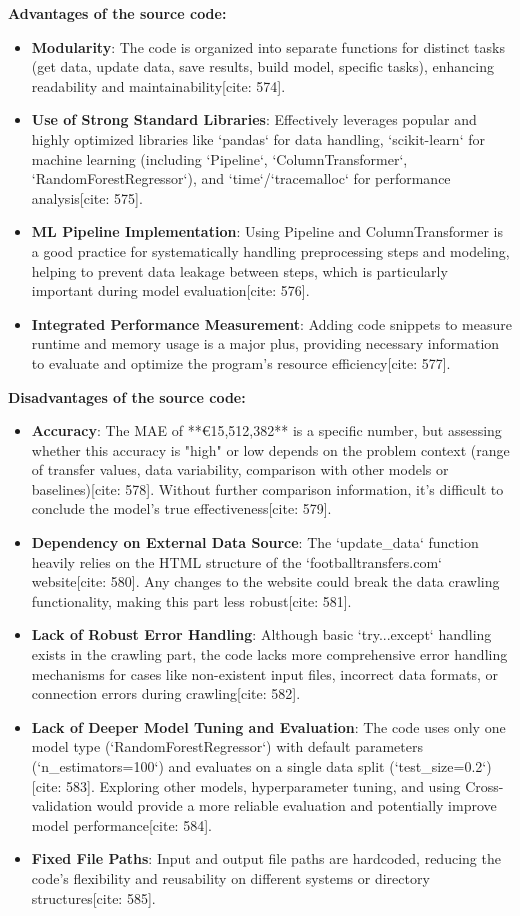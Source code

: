 \documentclass[12pt]{report}
\begin{document}
{{{\textbf{Advantages of the source code:}
\begin{itemize}
    \item \textbf{Modularity}: The code is organized into separate functions for distinct tasks (get data, update data, save results, build model, specific tasks), enhancing readability and maintainability[cite: 574].
    \item \textbf{Use of Strong Standard Libraries}: Effectively leverages popular and highly optimized libraries like `pandas` for data handling, `scikit-learn` for machine learning (including `Pipeline`, `ColumnTransformer`, `RandomForestRegressor`), and `time`/`tracemalloc` for performance analysis[cite: 575].
    \item \textbf{ML Pipeline Implementation}: Using Pipeline and ColumnTransformer is a good practice for systematically handling preprocessing steps and modeling, helping to prevent data leakage between steps, which is particularly important during model evaluation[cite: 576].
    \item \textbf{Integrated Performance Measurement}: Adding code snippets to measure runtime and memory usage is a major plus, providing necessary information to evaluate and optimize the program's resource efficiency[cite: 577].
\end{itemize}

\textbf{Disadvantages of the source code:}
\begin{itemize}
    \item \textbf{Accuracy}: The MAE of **€15,512,382** is a specific number, but assessing whether this accuracy is "high" or low depends on the problem context (range of transfer values, data variability, comparison with other models or baselines)[cite: 578]. Without further comparison information, it's difficult to conclude the model's true effectiveness[cite: 579].
    \item \textbf{Dependency on External Data Source}: The `update_data` function heavily relies on the HTML structure of the `footballtransfers.com` website[cite: 580]. Any changes to the website could break the data crawling functionality, making this part less robust[cite: 581].
    \item \textbf{Lack of Robust Error Handling}: Although basic `try...except` handling exists in the crawling part, the code lacks more comprehensive error handling mechanisms for cases like non-existent input files, incorrect data formats, or connection errors during crawling[cite: 582].
    \item \textbf{Lack of Deeper Model Tuning and Evaluation}: The code uses only one model type (`RandomForestRegressor`) with default parameters (`n_estimators=100`) and evaluates on a single data split (`test_size=0.2`)[cite: 583]. Exploring other models, hyperparameter tuning, and using Cross-validation would provide a more reliable evaluation and potentially improve model performance[cite: 584].
    \item \textbf{Fixed File Paths}: Input and output file paths are hardcoded, reducing the code's flexibility and reusability on different systems or directory structures[cite: 585].
\end{itemize}

}}}
\end{document}
